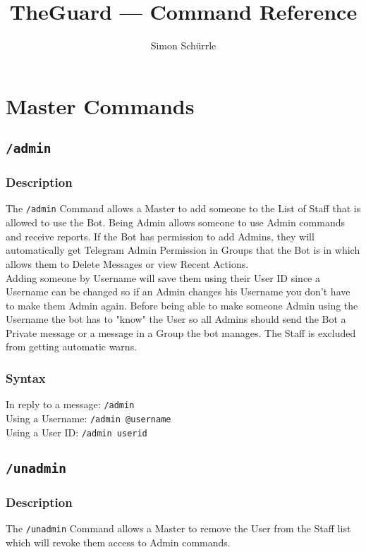 \documentclass[a4paper]{article}
\title{TheGuard --- Command Reference}
\author{Simon Schürrle}
\begin{document}
\maketitle
\tableofcontents

\section{Master Commands}

    \subsection{\texttt{/admin}}
        \subsubsection*{Description}
            The \texttt{/admin} Command allows a Master to add someone to the List of Staff that is allowed to use the Bot. Being Admin allows someone to use Admin commands and receive reports. If the Bot has permission to add Admins, they will automatically get Telegram Admin Permission in Groups that the Bot is in which allows them to Delete Messages or view Recent Actions.\\
            Adding someone by Username will save them using their User ID since a Username can be changed so if an Admin changes his Username you don't have to make them Admin again. Before being able to make someone Admin using the Username the bot has to "know" the User so all Admins should send the Bot a Private message or a message in a Group the bot manages. The Staff is excluded from getting automatic warns.

        \subsubsection*{Syntax}
            In reply to a message: \texttt{/admin}\\
            Using a Username: \texttt{/admin @username}\\
            Using a User ID: \texttt{/admin userid}


    \subsection{\texttt{/unadmin}}
        \subsubsection*{Description}
            The \texttt{/unadmin} Command allows a Master to remove the User from the Staff list which will revoke them access to Admin commands.
\end{document}
